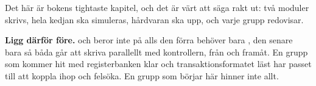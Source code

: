 \begin{warning}
Det här är bokens tightaste kapitel, och det är värt att säga rakt ut: två moduler skrivs, hela
kedjan ska simuleras, hårdvaran ska upp, och varje grupp redovisar.

\textbf{Ligg därför före.}  och  beror inte på
 alls \textemdash{} den förra behöver bara , den senare bara
 \textemdash{} så båda går att skriva parallellt med kontrollern, från
 och framåt. En grupp som kommer hit med registerbanken klar och transaktionsformatet
läst har passet till att koppla ihop och felsöka. En grupp som börjar här hinner inte allt.
\end{warning}







